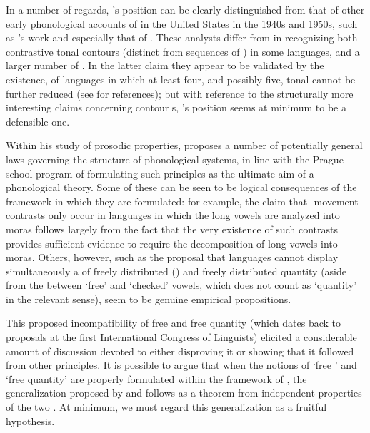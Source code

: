 In a number of regards, {\Trubetzkoy}'s position can be clearly
distinguished from that of other early phonological accounts of 
in the United States in the 1940s and 1950s, such as {\Sapir}'s work and
especially that of \citet{pike:tone_lgs}. These analysts differ from
{\Trubetzkoy} in recognizing both contrastive tonal contours (distinct
from sequences of ) in some languages, and a larger number of
. In the latter claim they appear to be validated by the
existence, of languages in which at least four, and possibly five,
tonal  cannot be further reduced (see
\citealt{sra78:tone_features} for references); but with reference to the
structurally more interesting claims concerning contour s,
{\Trubetzkoy}'s position seems at minimum to be a defensible one.

Within his study of prosodic properties, {\Trubetzkoy} proposes a number
of potentially general laws governing the structure of phonological
systems, in line with the Prague school program of formulating such
principles as the ultimate aim of a phonological theory. Some of these
can be seen to be logical consequences of the framework in which they
are formulated: for example, the claim that -movement contrasts
only occur in languages in which the long vowels are analyzed into
moras follows largely from the fact that the very existence of such
contrasts provides sufficient evidence to require the decomposition of
long vowels into moras. Others, however, such as the proposal that
languages cannot display simultaneously a  of freely
distributed ()  and freely distributed quantity (aside
from the  between `free' and `checked' vowels, which does not
count as `quantity' in the relevant sense), seem to be genuine
empirical propositions.

This proposed incompatibility of free  and free quantity (which
dates back to  proposals at the first
{International Congress of Linguists}) elicited a considerable amount of
discussion devoted to either disproving it or showing that it followed
from other principles. It is possible to argue that when the notions
of `free ' and `free quantity' are properly formulated within
the framework of , the generalization proposed by
{\Jakobson} and {\Trubetzkoy} follows as a theorem from independent
properties of the two \citep{sra84:halle-fest-II}. At minimum, we must
regard this generalization as a fruitful hypothesis.

